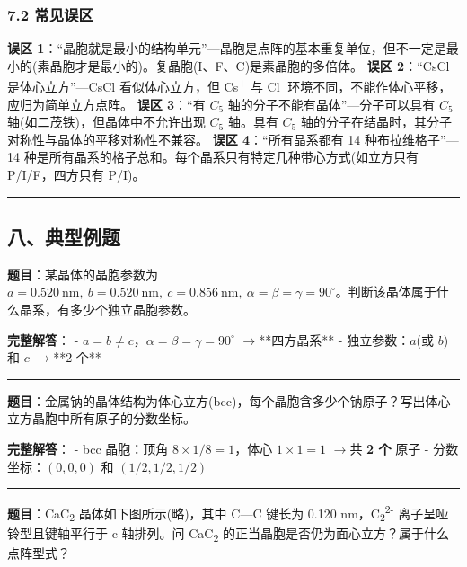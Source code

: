 \documentclass[a4paper,11pt]{ctexart}
\newcommand{\箭}{\ensuremath{\rightarrow}}
\newcommand{\左箭}{\ensuremath{\leftarrow}}
\newcommand{\上箭}{\ensuremath{\uparrow}}
\newcommand{\下箭}{\ensuremath{\downarrow}}
\newcommand{\衡}{\ensuremath{\rightleftharpoons}}
\newcommand{\双箭}{\ensuremath{\leftrightarrow}}
\newcommand{\约等于}{\ensuremath{\approx}}
\newcommand{\小于等于}{\ensuremath{\leq}}
\newcommand{\大于等于}{\ensuremath{\geq}}
\newcommand{\不等于}{\ensuremath{\neq}}
\newcommand{\西格马}{\ensuremath{\sigma}}
\newcommand{\派}{\ensuremath{\pi}}
\begin{document}
\subsubsection{7.2 常见误区}\label{ux5e38ux89c1ux8befux533a}

\textbf{误区 1}：``晶胞就是最小的结构单元''---晶胞是点阵的基本重复单位，但不一定是最小的(素晶胞才是最小的)。复晶胞(I、F、C)是素晶胞的多倍体。
\textbf{误区 2}：``CsCl 是体心立方''---CsCl 看似体心立方，但 Cs\textsuperscript{+} 与 Cl\textsuperscript{-} 环境不同，不能作体心平移，应归为简单立方点阵。
\textbf{误区 3}：``有 \(C_5\) 轴的分子不能有晶体''---分子可以具有 \(C_5\) 轴(如二茂铁)，但晶体中不允许出现 \(C_5\) 轴。具有 \(C_5\) 轴的分子在结晶时，其分子对称性与晶体的平移对称性不兼容。
\textbf{误区 4}：``所有晶系都有 14 种布拉维格子''---14 种是所有晶系的格子总和。每个晶系只有特定几种带心方式(如立方只有 P/I/F，四方只有 P/I)。

\begin{center}\rule{0.5\linewidth}{0.5pt}\end{center}

\subsection{八、典型例题}\label{ux516bux5178ux578bux4f8bux9898}

\textbf{题目}：某晶体的晶胞参数为 \(a = 0.520\ \mathrm{nm},\ b = 0.520\ \mathrm{nm},\ c = 0.856\ \mathrm{nm},\ \alpha = \beta = \gamma = 90^\circ\)。判断该晶体属于什么晶系，有多少个独立晶胞参数。

\textbf{完整解答}：
- \(a = b \neq c\)，\(\alpha = \beta = \gamma = 90^\circ\) \箭 **四方晶系**
- 独立参数：\(a\)(或 \(b\))和 \(c\) \箭 **2 个**

\begin{center}\rule{0.5\linewidth}{0.5pt}\end{center}

\textbf{题目}：金属钠的晶体结构为体心立方(bcc)，每个晶胞含多少个钠原子？写出体心立方晶胞中所有原子的分数坐标。

\textbf{完整解答}：
- bcc 晶胞：顶角 \(8 \times 1/8 = 1\)，体心 \(1 \times 1 = 1\) \箭 共 \textbf{2 个} 原子
- 分数坐标：\((0, 0, 0)\) 和 \((1/2, 1/2, 1/2)\)

\begin{center}\rule{0.5\linewidth}{0.5pt}\end{center}

\textbf{题目}：CaC\textsubscript{2} 晶体如下图所示(略)，其中 C---C 键长为 0.120 nm，C\textsubscript{2}\textsuperscript{2-} 离子呈哑铃型且键轴平行于 c 轴排列。问 CaC\textsubscript{2} 的正当晶胞是否仍为面心立方？属于什么点阵型式？
\end{document}
